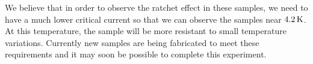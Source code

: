 We believe that in order to observe the ratchet effect in these samples,
we need to have a much lower critical current so that we can observe the 
samples near $4.2\,\kelvin$. At this temperature, the sample will be 
more resistant to small temperature variations. Currently new samples
are being fabricated to meet these requirements and it may soon be
possible to complete this experiment. 
